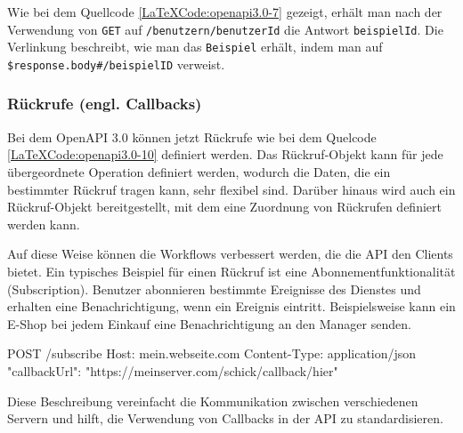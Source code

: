 \begin{LaTeXCode}[caption={Open API 3.0 - Verlinkungen},captionpos=b, label=LaTeXCode:openapi3.0-7][numbers=none]
{
	"paths": {
		"/benutzern/{benutzerId}": {
			"get": {
				"responses": {
					"200": {
						"links": {
							"address": {
								"operationId": "gibBeispielMitID"
							}
						},
						"parameters": {
							"exampleId": "\\\$response.body#/beispielID"
						}
...
\end{LaTeXCode}

Wie bei dem Quellcode \ref{LaTeXCode:openapi3.0-7} gezeigt, erhält man nach der Verwendung von \texttt{GET} auf \texttt{/benutzern/{benutzerId}} die Antwort \texttt{beispielId}. Die Verlinkung beschreibt, wie man das \texttt{Beispiel} erhält, indem man auf \texttt{\$response.body\#/beispielID} verweist.

\subsubsection{Rückrufe (engl. Callbacks)}

Bei dem OpenAPI 3.0 können jetzt Rückrufe wie bei dem Quelcode \ref{LaTeXCode:openapi3.0-10} definiert werden. Das Rückruf-Objekt kann für jede übergeordnete Operation definiert werden, wodurch die Daten, die ein bestimmter Rückruf tragen kann, sehr flexibel sind. Darüber hinaus wird auch ein Rückruf-Objekt bereitgestellt, mit dem eine Zuordnung von Rückrufen definiert werden kann.

Auf diese Weise können die Workflows verbessert werden, die die API den Clients bietet. Ein typisches Beispiel für einen Rückruf ist eine Abonnementfunktionalität (Subscription). Benutzer abonnieren bestimmte Ereignisse des Dienstes und erhalten eine Benachrichtigung, wenn ein Ereignis eintritt. Beispielsweise kann ein E-Shop bei jedem Einkauf eine Benachrichtigung an den Manager senden\cite{openapicallbacks17}.

\begin{LaTeXCode}[caption={Open API 3.0 - Callbacks\cite{openapicallbacks17}},captionpos=b, label=LaTeXCode:openapi3.0-10][numbers=none]
POST /subscribe
Host: mein.webseite.com
Content-Type: application/json
{
	"callbackUrl": "https://meinserver.com/schick/callback/hier"
}
\end{LaTeXCode}

Diese Beschreibung vereinfacht die Kommunikation zwischen verschiedenen Servern und hilft, die Verwendung von Callbacks in der API zu standardisieren.

